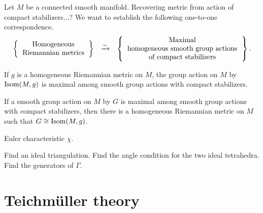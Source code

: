 \documentclass{../../large}
\begin{document}
\begin{prb}
Let $M$ be a connected smooth manifold.
Recovering metric from action of compact stabilizers...?
We want to establish the following one-to-one correspondence.
\[\begin{array}{ccc}
\left\{\begin{tabular}{c}Homogeneous\\Riemannian metrics\end{tabular}\right\}
&\xrightarrow{\sim}&
\left\{\begin{tabular}{c}Maximal\\homogeneous smooth group actions\\of compact stabilizers\end{tabular}\right\}.
\end{array}\]
\begin{parts}
\item If $g$ is a homogeneous Riemannian metric on $M$, the group action on $M$ by $\operatorname{Isom}(M,g)$ is maximal among smooth group actions with compact stabilizers.
\item If a smooth group action on $M$ by $G$ is maximal among smooth group actions with compact stabilizers, then there is a homogeneous Riemannian metric on $M$ such that $G\cong\operatorname{Isom}(M,g)$.
\end{parts}
\end{prb}
\begin{pf}
\end{pf}

\begin{prb}
Euler characteristic $\chi$.
\end{prb}
\begin{prb}
Find an ideal triangulation.
Find the angle condition for the two ideal tetrahedra.
Find the generators of $\Gamma$.
\end{prb}
\begin{prb}
\end{prb}
\begin{prb}
\end{prb}


\chapter{Teichm\"uller theory}
\section{}
\end{document}
